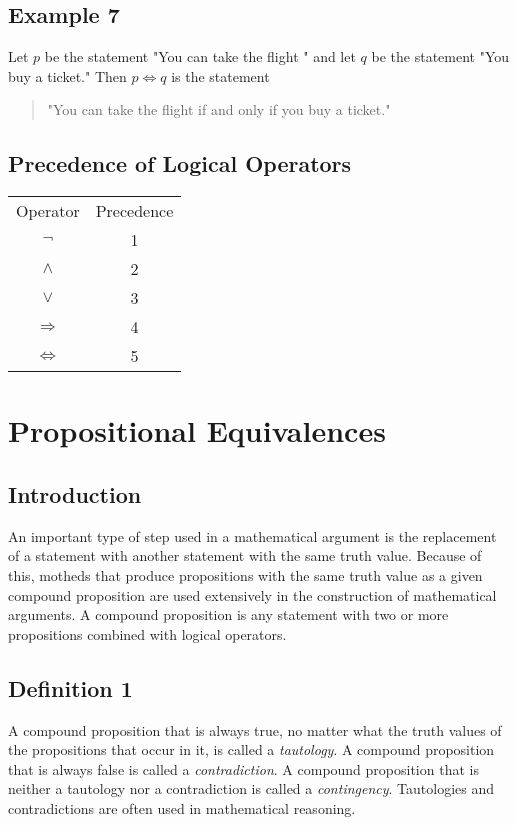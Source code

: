 \documentclass{article}
\begin{document}
\subsection*{Example 7}
Let $p$ be the statement "You can take the flight " and let $q$ be the statement "You buy a ticket."
Then $p \Leftrightarrow q$ is the statement
\begin{quote}
	"You can take the flight if and only if you buy a ticket."
\end{quote}
\subsection{Precedence of Logical Operators}
\begin{center}
	\begin{tabular}{c|c}
		Operator          & Precedence \\
		$\neg$            & 1          \\
		$\wedge$          & 2          \\
		$\vee$            & 3          \\
		$\Rightarrow$     & 4          \\
		$\Leftrightarrow$ & 5          \\
	\end{tabular}
\end{center}
\section{Propositional Equivalences}
\subsection*{Introduction}
An important type of step used in a mathematical argument is the replacement of a statement with another statement with the same truth value.
Because of this, motheds that produce propositions with the same truth value as a given compound proposition are used extensively in the construction
of mathematical arguments. A compound proposition is any statement with two or more propositions combined with logical operators.
\subsection*{Definition 1}
A compound proposition that is always true, no matter what the truth values of the propositions that occur in it, is called a \textit{tautology}.
A compound proposition that is always false is called a \textit{contradiction}. A compound proposition that is neither a tautology nor a contradiction
is called a \textit{contingency}. Tautologies and contradictions are often used in mathematical reasoning.
\end{document}
